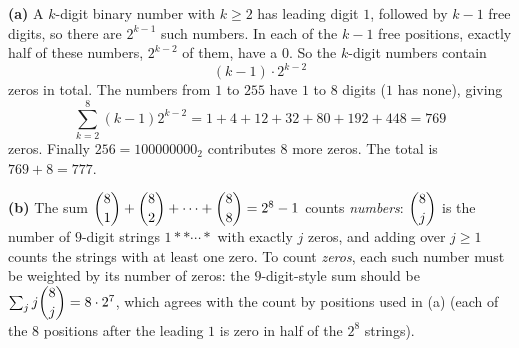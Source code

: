\textbf{(a)} A $k$-digit binary number with $k\ge 2$ has leading digit $1$, followed by $k-1$ free digits, so there are $2^{k-1}$ such numbers. In each of the $k-1$ free positions, exactly half of these numbers, $2^{k-2}$ of them, have a $0$. So the $k$-digit numbers contain
\[
(k-1)\cdot 2^{k-2}
\]
zeros in total. The numbers from $1$ to $255$ have $1$ to $8$ digits ($1$ has none), giving
\[
\sum_{k=2}^{8}(k-1)2^{k-2}=1+4+12+32+80+192+448=769
\]
zeros. Finally $256=100000000_2$ contributes $8$ more zeros. The total is $769+8=\boxed{777}$.

\textbf{(b)} The sum $\dbinom81+\dbinom82+\cdots+\dbinom88=2^8-1$ counts \emph{numbers}: $\dbinom8j$ is the number of $9$-digit strings $1\ast\ast\cdots\ast$ with exactly $j$ zeros, and adding over $j\ge1$ counts the strings with at least one zero. To count \emph{zeros}, each such number must be weighted by its number of zeros: the $9$-digit-style sum should be $\sum_j j\dbinom8j=8\cdot 2^7$, which agrees with the count by positions used in (a) (each of the $8$ positions after the leading $1$ is zero in half of the $2^8$ strings).
